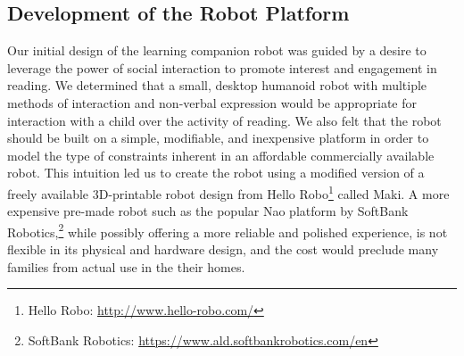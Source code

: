 \documentclass{sigchi}
\begin{document}
\subsection{Development of the Robot Platform}
Our initial design of the learning companion robot was guided by a desire to leverage the power of social interaction to promote interest and engagement in reading. We determined that a small, desktop humanoid robot with multiple methods of interaction and non-verbal expression would be appropriate for interaction with a child over the activity of reading. We also felt that the robot should be built on a simple, modifiable, and inexpensive platform in order to model the type of constraints inherent in an affordable commercially available robot. This intuition led us to create the robot using a modified version of a freely available 3D-printable robot design from Hello Robo\footnote{Hello Robo: \href{http://www.hello-robo.com/}{http://www.hello-robo.com/}} called Maki. A more expensive pre-made robot such as the popular Nao platform by SoftBank Robotics,\footnote{SoftBank Robotics: \href{https://www.ald.softbankrobotics.com/en}{https://www.ald.softbankrobotics.com/en}} while possibly offering a more reliable and polished experience, is not flexible in its physical and hardware design, and the cost would preclude many families from actual use in the their homes.
\end{document}
